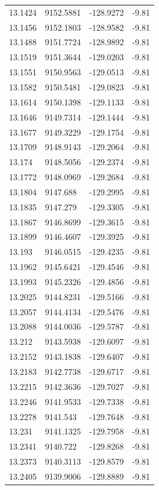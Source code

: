\begin{table}[H]
\begin{tabular}{llll}
13.1424 & 9152.5881 & -128.9272 & -9.81 \\
13.1456 & 9152.1803 & -128.9582 & -9.81 \\
13.1488 & 9151.7724 & -128.9892 & -9.81 \\
13.1519 & 9151.3644 & -129.0203 & -9.81 \\
13.1551 & 9150.9563 & -129.0513 & -9.81 \\
13.1582 & 9150.5481 & -129.0823 & -9.81 \\
13.1614 & 9150.1398 & -129.1133 & -9.81 \\
13.1646 & 9149.7314 & -129.1444 & -9.81 \\
13.1677 & 9149.3229 & -129.1754 & -9.81 \\
13.1709 & 9148.9143 & -129.2064 & -9.81 \\
13.174 & 9148.5056 & -129.2374 & -9.81 \\
13.1772 & 9148.0969 & -129.2684 & -9.81 \\
13.1804 & 9147.688 & -129.2995 & -9.81 \\
13.1835 & 9147.279 & -129.3305 & -9.81 \\
13.1867 & 9146.8699 & -129.3615 & -9.81 \\
13.1899 & 9146.4607 & -129.3925 & -9.81 \\
13.193 & 9146.0515 & -129.4235 & -9.81 \\
13.1962 & 9145.6421 & -129.4546 & -9.81 \\
13.1993 & 9145.2326 & -129.4856 & -9.81 \\
13.2025 & 9144.8231 & -129.5166 & -9.81 \\
13.2057 & 9144.4134 & -129.5476 & -9.81 \\
13.2088 & 9144.0036 & -129.5787 & -9.81 \\
13.212 & 9143.5938 & -129.6097 & -9.81 \\
13.2152 & 9143.1838 & -129.6407 & -9.81 \\
13.2183 & 9142.7738 & -129.6717 & -9.81 \\
13.2215 & 9142.3636 & -129.7027 & -9.81 \\
13.2246 & 9141.9533 & -129.7338 & -9.81 \\
13.2278 & 9141.543 & -129.7648 & -9.81 \\
13.231 & 9141.1325 & -129.7958 & -9.81 \\
13.2341 & 9140.722 & -129.8268 & -9.81 \\
13.2373 & 9140.3113 & -129.8579 & -9.81 \\
13.2405 & 9139.9006 & -129.8889 & -9.81 \\

\end{tabular}
\end{table}

